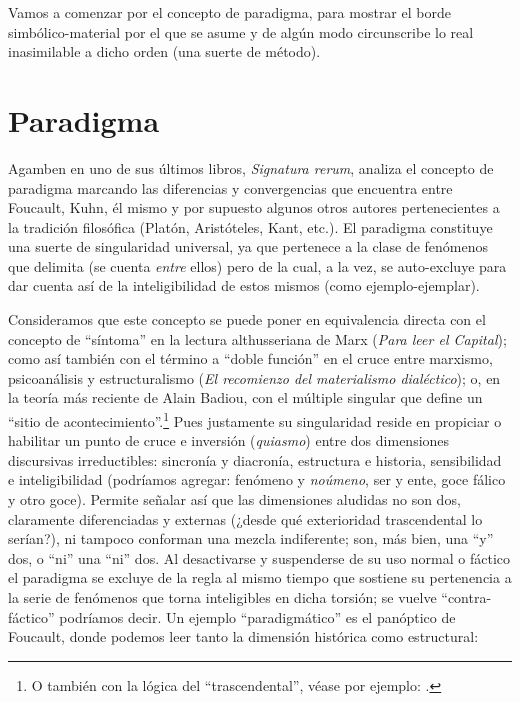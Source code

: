 Vamos a comenzar por el concepto de paradigma, para mostrar el borde simbólico-material por el que se asume y de algún modo circunscribe lo real inasimilable a dicho orden (una suerte de método).

\section{Paradigma}

Agamben en uno de sus últimos libros, \emph{Signatura rerum}, analiza el concepto de paradigma marcando las diferencias y convergencias que encuentra entre Foucault, Kuhn, él mismo y por supuesto algunos otros autores pertenecientes a la tradición filosófica (Platón, Aristóteles, Kant, etc.). El paradigma constituye una suerte de singularidad universal, ya que pertenece a la clase de fenómenos que delimita (se cuenta \emph{entre} ellos) pero de la cual, a la vez, se auto-excluye para dar cuenta así de la inteligibilidad de estos mismos (como ejemplo-ejemplar).

Consideramos que este concepto se puede poner en equivalencia directa con el concepto de \enquote{síntoma} en la lectura althusseriana de Marx (\emph{Para leer el Capital}); como así también con el término a \enquote{doble función} en el cruce entre marxismo, psicoanálisis y estructuralismo (\emph{El recomienzo del materialismo dialéctico}); o, en la teoría más reciente de Alain Badiou, con el múltiple singular que define un \enquote{sitio de acontecimiento}.\footnote{O también con la lógica del \enquote{trascendental}, véase por ejemplo: \cite[83]{@7013-BADIOU2010}.} Pues justamente su singularidad reside en propiciar o habilitar un punto de cruce e inversión (\emph{quiasmo}) entre dos dimensiones discursivas irreductibles: sincronía y diacronía, estructura e historia, sensibilidad e inteligibilidad (podríamos agregar: fenómeno y \emph{noúmeno}, ser y ente, goce fálico y otro goce). Permite señalar así que las dimensiones aludidas no son dos, claramente diferenciadas y externas (¿desde qué exterioridad trascendental lo serían?), ni tampoco conforman una mezcla indiferente; son, más bien, una \enquote{y} dos, o \enquote{ni} una \enquote{ni} dos. Al desactivarse y suspenderse de su uso normal o fáctico el paradigma se excluye de la regla al mismo tiempo que sostiene su pertenencia a la serie de fenómenos que torna inteligibles en dicha torsión; se vuelve \enquote{contra-fáctico} podríamos decir. Un ejemplo \enquote{paradigmático} es el panóptico de Foucault, donde podemos leer tanto la dimensión histórica como estructural:

